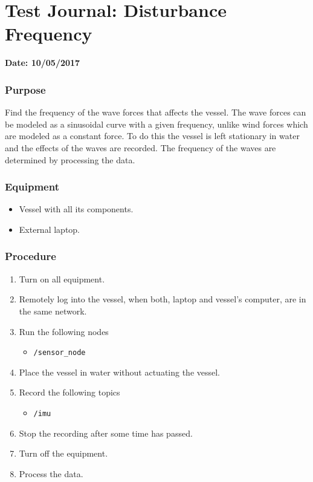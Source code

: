 \chapter{Test Journal: Disturbance Frequency} \label{app:Disturbance}

\textbf{Date: 10/05/2017}

\subsection*{Purpose}
Find the frequency of the wave forces that affects the vessel. The wave forces can be modeled as a sinusoidal curve with a given frequency, unlike wind forces which are modeled as a constant force. To do this the vessel is left stationary in water and the effects of the waves are recorded. The frequency of the waves are determined by processing the data.

\subsection*{Equipment}
\begin{itemize}
    \item Vessel with all its components. 
    \item External laptop.
\end{itemize}

\subsection*{Procedure}
\begin{enumerate}
    \item Turn on all equipment.
    \item Remotely log into the vessel, when both, laptop and vessel's computer, are in the same network.
    \item Run the following nodes
    \begin{itemize}
        \item \lstinline[style=cinline]{/sensor_node}
    \end{itemize}
    \item Place the vessel in water without actuating the vessel.
    \item Record the following topics
    \begin{itemize}
        \item \lstinline[style=cinline]{/imu}      
    \end{itemize}
    \item Stop the recording after some time has passed.
    \item Turn off the equipment.
    \item Process the data.
\end{enumerate}

